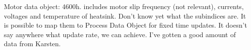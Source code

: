 
Motor data object: 4600h. includes motor slip frequency (not relevant), currents, voltages and temperature of heatsink. Don't know yet what the subindices are.
It is possible to map them to Process Data Object for fixed time updates. It doesn't say anywhere what update rate, we can achieve.
I've gotten a good amount of data from Karsten.